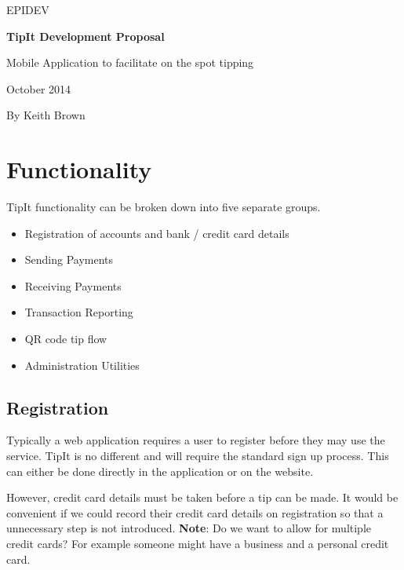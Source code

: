 \documentclass[a4paper, 11pt, oneside]{Thesis}  %
\begin{document}
\frontmatter      %

EPIDEV

 \textbf{TipIt Development Proposal}

 Mobile Application to facilitate on the spot tipping

October 2014

By Keith Brown




\pagestyle{fancy}  %


\mainmatter
\pagestyle{fancy}

\chapter{Functionality}
\label{Functionality}

TipIt functionality can be broken down into five separate groups.

\begin{itemize}
\item  Registration of accounts and bank / credit card details
\item  Sending Payments
\item  Receiving Payments
\item  Transaction Reporting
\item  QR code tip flow
\item  Administration Utilities
\end{itemize}

\section{Registration}

Typically a web application requires a user to register before they may use the service. TipIt is no different and will require the standard sign up process. This can either be done directly in the application or on the website.

However, credit card details must be taken before a tip can be made. It would be convenient if we could record their credit card details on registration so that a unnecessary step is not introduced. \textbf{Note}: Do we want to allow for multiple credit cards? For example someone might have a business and a personal credit card.
\end{document}
